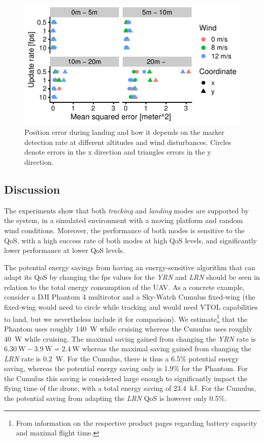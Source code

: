 \documentclass[conference]{IEEEtran}
\begin{document}
\begin{figure}[t]
\centering
\includegraphics{data_visualization/QoSLanding.pdf}
\caption{Position error during landing and how it depends 
on the marker detection rate at different altitudes and wind disturbances.
Circles denote errors in the x direction and triangles 
errors in the y direction.}
\label{fig:PositionErrorDuringLanding}
\end{figure}

\subsection{Discussion}

The experiments show that both \emph{tracking} and \emph{landing} modes are
supported by the system, in a simulated environment with a moving
platform and random wind conditions. Moreover, the performance of both
modes is sensitive to the QoS, with a high success rate of both modes
at high QoS levels, and significantly lower performance at lower QoS
levels.

The potential energy savings from having an energy-sensitive algorithm
that can adapt its QoS by changing the fps values for the \emph{YRN} and \emph{LRN}
should be seen
in relation to the total energy consumption of the UAV. As a concrete
example, consider a DJI Phantom 4 multirotor and a Sky-Watch Cumulus
fixed-wing (the fixed-wing would need to circle while tracking and 
would need VTOL capabilities to land, but we nevertheless include it 
for comparison). We estimate\footnote{From information on the respective
  product pages regarding battery capacity and maximal flight time.}
that the Phantom uses roughly \SI{140}{\watt} while cruising whereas the Cumulus
uses roughly \SI{40}{\watt} while cruising. The maximal saving gained from
changing the \emph{YRN}
rate is 
$\SI{6.30}{\watt}-\SI{3.9}{\watt}=\SI{2.4}{\watt}$ whereas the
maximal saving gained from changing the \emph{LRN}
rate is
\SI{0.2}{\watt}. For the Cumulus, there is thus a 6.5\% potential energy
saving, whereas the potential energy saving only is 1.9\% for the
Phantom. For the Cumulus this saving is considered large enough to
significantly impact the flying time of the drone, with a total energy
saving of \SI{23.4}{\kilo \joule}. For the Cumulus, the potential saving from adapting
the \emph{LRN}
QoS is however only 0.5\%. 
\end{document}
